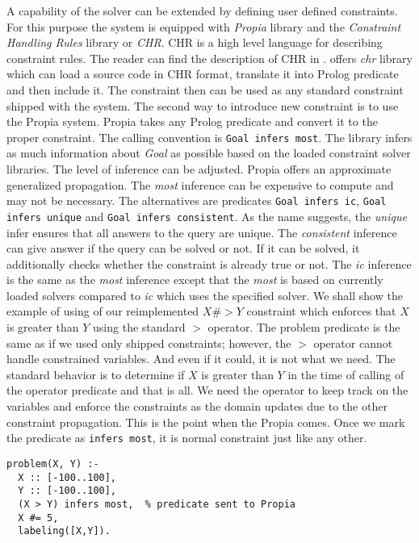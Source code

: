 A capability of the solver can be extended by defining user defined constraints. For this
purpose the system is equipped with {\em Propia} library and the {\em Constraint Handling Rules}
library or {\em CHR}. CHR is a high level language for describing constraint rules. The reader can find
the description of CHR in \cite{chr:website}.
\eclipse offers {\em chr} library which can load a source code in CHR format, translate it
into Prolog predicate and then include it. The constraint then can be used as any standard
constraint shipped with the system.
The second way to introduce new constraint is to use the Propia system. Propia takes 
any Prolog predicate and convert it to the proper constraint.
The calling convention is \texttt{Goal infers most}. The library infers as much information about {\em Goal} 
as possible based on the loaded constraint solver libraries. The level of inference can be adjusted.
Propia offers an approximate generalized propagation. The {\em most} inference can be expensive 
to compute and may not be necessary. The alternatives are predicates \texttt{Goal infers ic}, 
\texttt{Goal infers unique} and \texttt{Goal infers consistent}. As the name suggests, the {\em unique} 
infer ensures that all answers to the query are unique. The {\em consistent} inference can give
answer if the query can be solved or not. If it can be solved, it additionally checks whether the
constraint is already true or not. The {\em ic} inference is the same as the {\em most} inference except that
the {\em most} is based on currently loaded solvers compared to {\em ic} which uses the specified solver.
We shall show the example of using of our reimplemented $X \#> Y$ constraint which 
enforces that $X$ is greater than $Y$ using the standard $>$ operator. The problem predicate is the same 
as if we used only shipped constraints; however, the $>$ operator cannot handle constrained
variables. And even if it could, it is not what we need. The standard behavior is to 
determine if $X$ is greater than $Y$ in the time of calling of the operator predicate and
that is all. We need the operator to keep track on the variables and enforce the constraints
as the domain updates due to the other constraint propagation. This is the point when the Propia
comes. Once we mark the predicate as \texttt{infers most}, it is normal
constraint just like any other.

\begin{verbatim}
problem(X, Y) :-
  X :: [-100..100], 
  Y :: [-100..100], 
  (X > Y) infers most,  % predicate sent to Propia   
  X #= 5, 
  labeling([X,Y]).
\end{verbatim}

